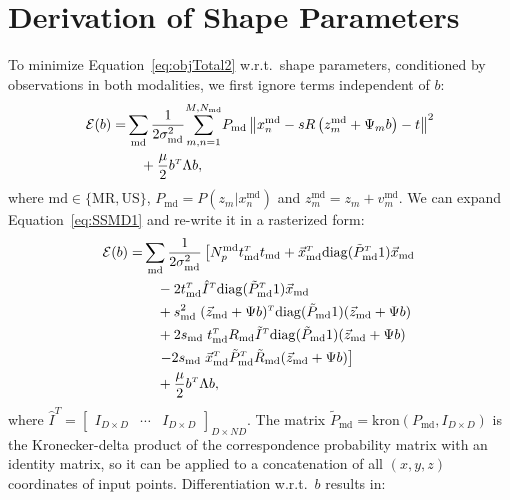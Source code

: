 \documentclass[journal]{IEEEtran}
\newcommand{\trans}[1]{#1^{\scriptscriptstyle T}}
\newcommand{\diag}{\mathrm{diag}}
\newcommand{\kron}{\mathrm{kron}}
\newcommand{\wrt}{w.r.t.}
\begin{document}
\section{Derivation of Shape Parameters}\label{sec:app:ssm}
To minimize Equation~\eqref{eq:objTotal2} \wrt\ shape parameters, conditioned by observations in both modalities, we first ignore terms independent of $b$:
\begin{align}\label{eq:SSMD1}
  \mathcal{E}(b) = & \sum_\mathrm{md}\dfrac{1}{2\sigma^2_\mathrm{md}}\!\sum_{m,n=1}^{M,N_\mathrm{md}}\!P_\mathrm{md}\left\|x^\mathrm{md}_n-sR\left(z^\mathrm{md}_m+\Psi_mb\right)-t\right\|^2\notag\\
  & \quad + \frac{\mu}{2}\trans{b}\Lambda{b},
\end{align}
where $\mathrm{md}\in\{\mathrm{MR},\mathrm{US}\}$, $P_\mathrm{md}=P(z_m|x^\mathrm{md}_n)$ and $z^\mathrm{md}_m=z_m+v^\mathrm{md}_m$. We can expand Equation~\eqref{eq:SSMD1} and re-write it in a rasterized form:
\begin{align}\label{eq:SSMD2}
  \mathcal{E}(b) = & \sum_\mathrm{md}\dfrac{1}{2\sigma^2_\mathrm{md}}\left[N^\mathrm{md}_p\trans{t}_\mathrm{md}t_\mathrm{md}+\trans{\vec{x}_\mathrm{md}}\diag(\trans{\tilde{P}_\mathrm{md}}1)\vec{x}_\mathrm{md}\right.\notag\\
  & \quad -2\trans{t}_\mathrm{md}\trans{\hat{I}}\diag(\trans{\tilde{P}_\mathrm{md}}1)\vec{x}_\mathrm{md}\notag\\
  & \quad +s^2_\mathrm{md}\;\trans{(\vec{z}_\mathrm{md}+{\Psi}b)}\diag(\tilde{P}_\mathrm{md}1)(\vec{z}_\mathrm{md}+{\Psi}b)\notag\\
  & \quad +2s_\mathrm{md}\;\trans{t}_\mathrm{md}R_\mathrm{md}\trans{\tilde{I}}\diag(\tilde{P}_\mathrm{md}1)(\vec{z}_\mathrm{md}+{\Psi}b)\notag\\
  & \quad \left.-2s_\mathrm{md}\;\trans{\vec{x}_\mathrm{md}}\trans{\tilde{P}_\mathrm{md}}\tilde{R}_\mathrm{md}(\vec{z}_\mathrm{md}+{\Psi}b)\right]\notag\\
  & \quad + \frac{\mu}{2}\trans{b}\Lambda{b},
\end{align}
where $\trans{\hat{I}} = \begin{bmatrix} I_{D\times D} & \cdots & I_{D\times D} \end{bmatrix}_{D\times ND}$. The matrix $\tilde{P}_\mathrm{md}=\kron{(P_\mathrm{md},I_{D\times{D}})}$ is the Kronecker-delta product of the correspondence probability matrix with an identity matrix, so it can be applied to a concatenation of all $(x,y,z)$ coordinates of input points.  Differentiation \wrt\ $b$ results in:
\end{document}
